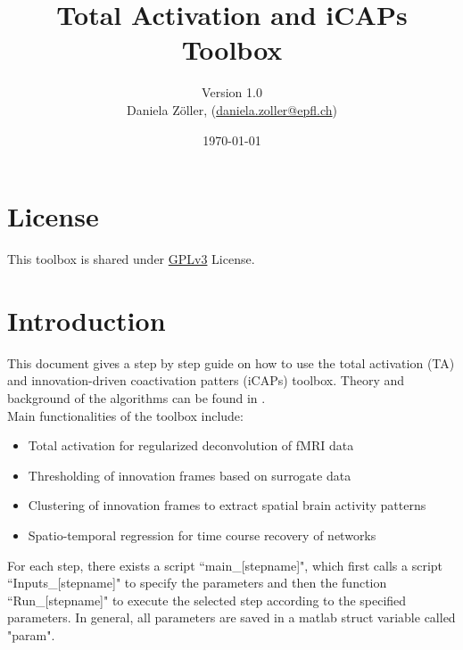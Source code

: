 \documentclass{article}
\newcommand{\texcountinc}{%
  \immediate\write18{texcount -inc \jobname.tex > \jobname.wcdetail }%
}
\begin{document}

\title{Total Activation and iCAPs Toolbox}
\author{Version 1.0\\Daniela Zöller, (\href{daniela.zoller@epfl.ch}{daniela.zoller@epfl.ch})}
\date{\today}

\maketitle

\tableofcontents


\section{License}
This toolbox is shared under \href{https://www.gnu.org/licenses/gpl.html}{GPLv3} License. %

\section{Introduction}
This document gives a step by step guide on how to use the total activation (TA) and innovation-driven coactivation patters (iCAPs) toolbox. Theory and background of the algorithms can be found in \cite{Karahanoglu2011,Karahanoglu2013,Karahanoglu2015,Farouj2017,Zoller2018}.\\
Main functionalities of the toolbox include:
\begin{itemize}
\item Total activation for regularized deconvolution of fMRI data
\item Thresholding of innovation frames based on surrogate data
\item Clustering of innovation frames to extract spatial brain activity patterns
\item Spatio-temporal regression for time course recovery of networks
\end{itemize}

For each step, there exists a script ``main\_[stepname]", which first calls a script ``Inputs\_[stepname]" to specify the parameters and then the function ``Run\_[stepname]" to execute the selected step according to the specified parameters. In general, all parameters are saved in a matlab struct variable called "param".
\end{document}
